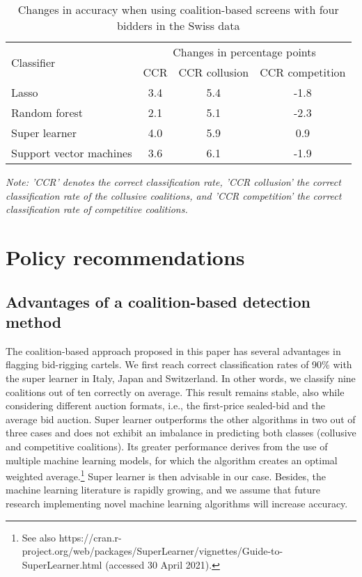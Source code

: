 \documentclass[a4paper,11pt]{article}
\begin{document}
	\begin{table}[ht]
		\caption{Changes in accuracy when using coalition-based screens with four bidders in the Swiss data}\label{CCR_Four}
		\begin{center}
			\begin{tabular}{lccc}
				\hline
				\multirow{2}{*}{Classifier} & \multicolumn{3}{c}{Changes in percentage points}               \\ \cline{2-4} 
				& CCR  & CCR collusion  & CCR competition \\ \hline
				Lasso                       & 3.4   & 5.4             & -1.8                \\
				Random   forest             & 2.1   & 5.1             & -2.3               \\
				Super learner               & 4.0   & 5.9             & 0.9              \\
				Support   vector machines   & 3.6   & 6.1             & -1.9              \\ \hline
			\end{tabular}
		\end{center}
		\par
		\textit{Note: 'CCR' denotes the correct classification rate, 'CCR collusion' the correct classification rate of the collusive coalitions, and 'CCR competition' the correct classification rate of competitive coalitions.}
	\end{table}
	
	
	\section{Policy recommendations}\label{policyrecom}
	
	\subsection{Advantages of a coalition-based detection method}
	The coalition-based approach proposed in this paper has several advantages in flagging bid-rigging cartels. We first reach correct classification rates of 90\% with the super learner in Italy, Japan and Switzerland. In other words, we classify nine coalitions out of ten correctly on average. This result remains stable, also while considering different auction formats, i.e., the first-price sealed-bid and the average bid auction. Super learner outperforms the other algorithms in two out of three cases and does not exhibit an imbalance in predicting both classes (collusive and competitive coalitions). Its greater performance derives from the use of multiple machine learning models, for which the algorithm creates an optimal weighted average.\footnote{See also https://cran.r-project.org/web/packages/SuperLearner/vignettes/Guide-to-SuperLearner.html (accessed 30 April 2021).}  Super learner is then advisable in our case. Besides, the machine learning literature is rapidly growing, and we assume that future research implementing novel machine learning algorithms will increase accuracy.
	
\end{document}
